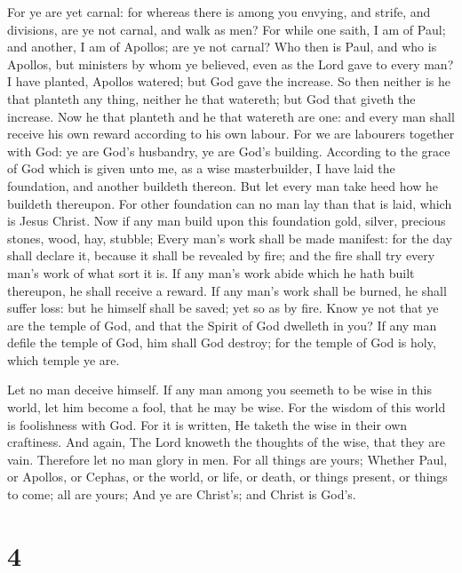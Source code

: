  For ye are yet carnal: for whereas there is among you
envying, and strife, and divisions, are ye not carnal, and walk as men?
 For while one saith, I am of Paul; and another, I am of
Apollos; are ye not carnal?  Who then is Paul, and who is
Apollos, but ministers by whom ye believed, even as the Lord gave to
every man?  I have planted, Apollos watered; but God gave
the increase.  So then neither is he that planteth any
thing, neither he that watereth; but God that giveth the increase.
 Now he that planteth and he that watereth are one: and
every man shall receive his own reward according to his own labour.
 For we are labourers together with God: ye are God's
husbandry, ye are God's building.  According to the grace
of God which is given unto me, as a wise masterbuilder, I have laid the
foundation, and another buildeth thereon. But let every man take heed
how he buildeth thereupon.  For other foundation can no man
lay than that is laid, which is Jesus Christ.  Now if any
man build upon this foundation gold, silver, precious stones, wood, hay,
stubble;  Every man's work shall be made manifest: for the
day shall declare it, because it shall be revealed by fire; and the fire
shall try every man's work of what sort it is.  If any
man's work abide which he hath built thereupon, he shall receive a
reward.  If any man's work shall be burned, he shall suffer
loss: but he himself shall be saved; yet so as by fire. 
Know ye not that ye are the temple of God, and that the Spirit of God
dwelleth in you?  If any man defile the temple of God, him
shall God destroy; for the temple of God is holy, which temple ye are.

 Let no man deceive himself. If any man among you seemeth
to be wise in this world, let him become a fool, that he may be wise.
 For the wisdom of this world is foolishness with God. For
it is written, He taketh the wise in their own craftiness. 
And again, The Lord knoweth the thoughts of the wise, that they are
vain.  Therefore let no man glory in men. For all things
are yours;  Whether Paul, or Apollos, or Cephas, or the
world, or life, or death, or things present, or things to come; all are
yours;  And ye are Christ's; and Christ is God's.

\hypertarget{section-3}{%
\section{4}\label{section-3}}

